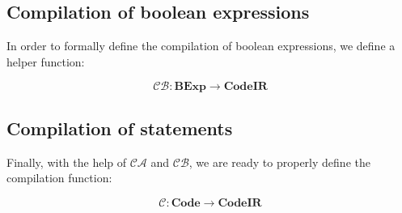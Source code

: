 \documentclass{article}
\begin{document}
\subsection{Compilation of boolean expressions}

In order to formally define the compilation of boolean expressions, we define a helper function:

\[
\mathcal{CB}: \textbf{BExp} \rightarrow \textbf{CodeIR}
\]

\begin{table}[h!]
\centering
\renewcommand{\arraystretch}{1.8} 

\end{table}


\newpage
\subsection{Compilation of statements}

Finally, with the help of $\mathcal{CA}$ and $\mathcal{CB}$, we are ready to properly define the compilation function:

\[
\mathcal{C}: \textbf{Code} \rightarrow \textbf{CodeIR}
\]
\end{document}
